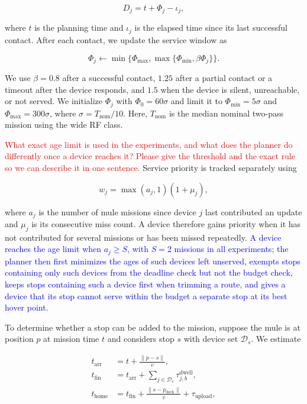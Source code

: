 \documentclass[conference]{IEEEtran}
\begin{document}
\begin{equation}
D_j=t+\Phi_j-\iota_j,
\label{eq:deadline}
\end{equation}

where $t$ is the planning time and $\iota_j$ is the elapsed time since its last
successful contact. After each contact, we update the service window as

\[
\Phi_j
\leftarrow
\min\{\Phi_{\max},
\max\{\Phi_{\min},\beta\Phi_j\}\}.
\]

We use $\beta=0.8$ after a successful contact, $1.25$ after a partial contact or
a timeout after the device responds, and $1.5$ when the device is silent,
unreachable, or not served. We initialize $\Phi_j$ with
$\Phi_0=60\sigma$ and limit it to
$\Phi_{\min}=5\sigma$ and $\Phi_{\max}=300\sigma$, where
$\sigma=T_{\mathrm{nom}}/10$. Here, $T_{\mathrm{nom}}$ is the median nominal
two-pass mission using the wide RF class.

\textcolor{red}{What exact age limit is used in the experiments, and what does the planner do differently once a device reaches it? Please give the threshold and the exact rule so we can describe it in one sentence.}
Service priority is tracked separately using

\begin{equation}
w_j=\max(a_j,1)(1+\mu_j),
\label{eq:coverage-weight}
\end{equation}

where $a_j$ is the number of mule missions since device $j$ last contributed an
update and $\mu_j$ is its consecutive miss count. A device therefore gains
priority when it has not contributed for several missions or has been missed
repeatedly. \textcolor{blue}{A device reaches the age limit when $a_j\ge S$, with $S=2$ missions in all
experiments; the planner then first minimizes the ages of such devices left
unserved, exempts stops containing only such devices from the deadline check but
not the budget check, keeps stops containing such a device first when trimming a
route, and gives a device that its stop cannot serve within the budget a separate
stop at its best hover point.}

To determine whether a stop can be added to the mission, suppose the mule is at
position $p$ at mission time $t$ and considers stop $s$ with device set
$\mathcal{D}_s$. We estimate

\begin{align}
t_{\mathrm{arr}}
&=
t+\frac{\|p-s\|}{v},
\\
t_{\mathrm{fin}}
&=
t_{\mathrm{arr}}
+
\sum_{j\in\mathcal{D}_s}
\tau_{j,b}^{\mathrm{dwell}},
\\
t_{\mathrm{home}}
&=
t_{\mathrm{fin}}
+
\frac{\|s-p_{\mathrm{dock}}\|}{v}
+
\tau_{\mathrm{upload}},
\end{align}
\end{document}
